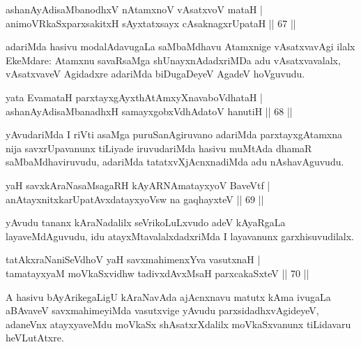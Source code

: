 \begin{shl}
ashanAyAdisaMbanodhxV nA\s \s tamxnoV vAsatxvoV mataH |\\
animoVRkaSxparxsakitxH sAyxtatxsayx cAsaknagxrUpataH \hfill || 67 ||
\end{shl}

\begin{artha}
adariMda hasivu modalAdavugaLa saMbaMdhavu Atamxnige vAsatxvavAgi ilalx EkeMdare: Atamxnu savaRsaMga shUnayxnAdadxriMDa adu vAsatxvavalalx, vAsatxvaveV Agidadxre adariMda biDugaDeyeV AgadeV hoVguvudu.
\end{artha}

\begin{shl}
yata EvamataH parxtayxgAyxthAtAmxyXnavaboVdhataH |\\
ashanAyAdisaMbanadhxH samayxgobxVdhAdatoV hanutiH \hfill || 68 ||
\end{shl}

\begin{artha}
yAvudariMda I riVti asaMga puruSanAgiruvano adariMda parxtayxgAtamxna nija savxrUpavanunx tiLiyade iruvudariMda hasivu muMtAda dhamaR saMbaMdhaviruvudu, adariMda tatatxvXjAcnxnadiMda adu nAshavAguvudu.
\end{artha}


\begin{shl}
yaH savxkAraNasaMsagaRH kAyARNAmatayxyoV BaveVtf |\\
anAtayxnitxkarUpatAvxdatayxyoV\s sw na gaqhayxteV \hfill || 69 ||
\end{shl}

\begin{artha}
yAvudu tananx kAraNadalilx seVrikoLuLxvudo adeV kAyaRgaLa layaveMdAguvudu, idu atayxMtavalalxdadxriMda I layavanunx garxhisuvudilalx.
\end{artha}


\begin{shl}
tatAkxraNaniSeVdhoV yaH savxmahimenxYva vasutxnaH |\\
tamatayxyaM moVkaSxvidhw tadivxdAvxMsaH parxcakaSxteV \hfill || 70 ||
\end{shl}

\begin{artha}
A hasivu bAyArikegaLigU kAraNavAda ajAcnxnavu matutx kAma ivugaLa aBAvaveV savxmahimeyiMda vasutxvige yAvudu parxsidadhxvAgideyeV, adaneVnx atayxyaveMdu moVkaSx shAsatxrXdalilx moVkaSxvanunx tiLidavaru heVLutAtxre.
\end{artha}

